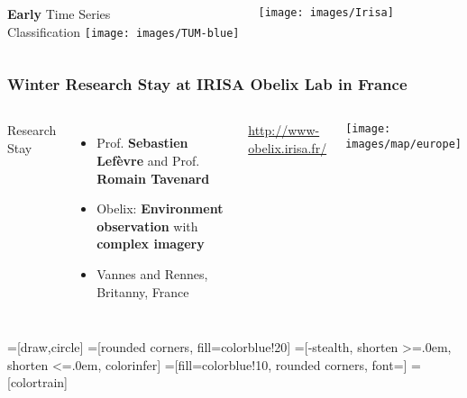 

{
	\begin{frame}[plain]
	\vfill
	\Huge\color{tumbluedark}
	\begin{columns}
		\vspace{4em}
		
		\hfill \textbf{Early} Time Series \\\hfill Classification
		\texttt{[image: images/TUM-blue]}
		
		\vspace{1em}
		\texttt{[image: images/Irisa]}
	\end{columns}
	
	\vfill
\end{frame}
}


\begin{frame}
	\frametitle{Winter Research Stay at IRISA Obelix Lab in France}
	
	\begin{columns}
		\column{.5\textwidth}
		
		Research Stay
		\begin{itemize}[itemsep=1em]
			\item Prof. \textbf{Sebastien Lefèvre} and Prof. \textbf{Romain Tavenard}
			\item Obelix: \textbf{Environment observation} with \textbf{complex imagery}
			\item Vannes and Rennes, Britanny, France
		\end{itemize}
		
		\vspace{1em}
		\url{http://www-obelix.irisa.fr/}
		
		\column{.5\textwidth}
		
		\texttt{[image: images/map/europe]}
		
	\end{columns}
	
\end{frame}


=[draw,circle]
=[rounded corners, fill=colorblue!20]
=[-stealth, shorten >=.0em, shorten <=.0em, colorinfer]
=[fill=colorblue!10, rounded corners, font=\small]
=[colortrain]

